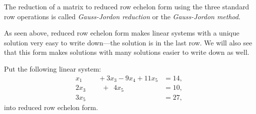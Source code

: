 \begin{definition}
The reduction of a matrix to reduced row echelon form using the three standard row operations is called \emph{Gauss-Jordon reduction} or the \emph{Gauss-Jordon method}.  
\end{definition}



As seen above, reduced row echelon form makes linear systems with a unique solution very easy to write down---the solution is in the last row.  We will also see that this form makes solutions with many solutions easier to write down as well.  

\begin{example}
Put the following linear system:
\begin{align*}
x_1\phantom{+2x_3} + 3x_3 -9 x_4 + 11 x_5 & = 14, \\
2x_3 \phantom{-9x_4} +\phantom{1} 4x_5 & = 10, \\
3x_5 & = 27, 
\end{align*}
into reduced row echelon form. 

\solution


\end{example}
